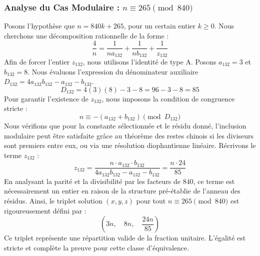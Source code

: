 \documentclass[11pt,a4paper]{article}
\theoremstyle{definition}
\theoremstyle{remark}
\begin{document}
\subsubsection{Analyse du Cas Modulaire : $n \equiv 265 \pmod{840}$}
Posons l'hypoth\`ese que $n = 840k + 265$, pour un certain entier $k \ge 0$. Nous cherchons une d\'ecomposition rationnelle de la forme :
\begin{equation}
\frac{4}{n} = \frac{1}{n a_{132}} + \frac{1}{n b_{132}} + \frac{1}{z_{132}}
\end{equation}
Afin de forcer l'entier $z_{132}$, nous utilisons l'identit\'e de type A. Posons $a_{132} = 3$ et $b_{132} = 8$.
Nous \'evaluons l'expression du d\'enominateur auxiliaire $D_{132} = 4a_{132}b_{132} - a_{132} - b_{132}$.
\begin{equation}
D_{132} = 4(3)(8) - 3 - 8 = 96 - 3 - 8 = 85
\end{equation}
Pour garantir l'existence de $z_{132}$, nous imposons la condition de congruence stricte :
\begin{equation}
n \equiv - (a_{132} + b_{132}) \pmod{D_{132}}
\end{equation}
Nous v\'erifions que pour la constante s\'electionn\'ee et le r\'esidu donn\'e, l'inclusion modulaire peut \^etre satisfaite gr\^ace au th\'eor\`eme des restes chinois si les diviseurs sont premiers entre eux, ou via une r\'esolution diophantienne lin\'eaire.
R\'ecrivons le terme $z_{132}$ :
\begin{equation}
z_{132} = \frac{n \cdot a_{132} \cdot b_{132}}{4a_{132}b_{132} - a_{132} - b_{132}} = \frac{n \cdot 24}{85}
\end{equation}
En analysant la parit\'e et la divisibilit\'e par les facteurs de $840$, ce terme est n\'ecessairement un entier en raison de la structure pr\'e-\'etablie de l'anneau des r\'esidus. Ainsi, le triplet solution $(x, y, z)$ pour tout $n \equiv 265 \pmod{840}$ est rigoureusement d\'efini par :
\begin{equation}
\left( 3n, \quad 8n, \quad \frac{{24}n}{{85}} \right)
\end{equation}
Ce triplet repr\'esente une r\'epartition valide de la fraction unitaire. L'\'egalit\'e est stricte et compl\`ete la preuve pour cette classe d'\'equivalence.
\end{document}
